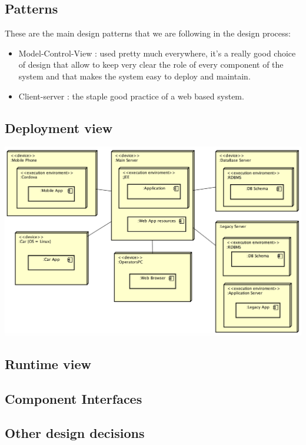 \documentclass[]{article}
\providecommand{\tightlist}{%
  \setlength{\itemsep}{0pt}\setlength{\parskip}{0pt}}
\begin{document}
\subsection{Patterns}\label{patterns}

These are the main design patterns that we are following in the design
process:

\begin{itemize}
\tightlist
\item
  Model-Control-View : used pretty much everywhere, it's a really good
  choice of design that allow to keep very clear the role of every
  component of the system and that makes the system easy to deploy and
  maintain.
\item
  Client-server : the staple good practice of a web based system.
\end{itemize}

\subsection{Deployment view}\label{deployment-view}

\centerline{\includegraphics{./deployment/diagram.png}}

\subsection{Runtime view}\label{runtime-view}

\subsection{Component Interfaces}\label{component-interfaces}

\subsection{Other design decisions}\label{other-design-decisions}
\end{document}
